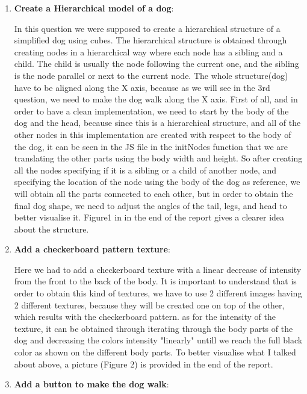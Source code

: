 \documentclass{article}
\begin{document}
\begin{enumerate}
\item \textbf{Create a Hierarchical model of a dog}:

In this question we were supposed to create a hierarchical structure of a simplified dog using cubes. The hierarchical structure is obtained through creating nodes in a hierarchical way where each node has a sibling and a child. The child is usually the node following the current one, and the sibling is the node parallel or next to the current node. The whole structure(dog) have to be aligned along the X axis, because as we will see in the 3rd question, we need to make the dog walk along the X axis. First of all, and in order to have a clean implementation, we need to start by the body of the dog and the head, because since this is a hierarchical structure, and all of the other nodes in this implementation are created with respect to the body of the dog, it can be seen in the JS file in the initNodes function that we are translating the other parts using the body width and height. So after creating all the nodes specifying if it is a sibling or a child of another node, and specifying the location of the node using the body of the dog as reference, we will obtain all the parts connected to each other, but in order to obtain the final dog shape, we need to adjust the angles of the tail, legs, and head to better visualise it. Figure1 in in the end of the report gives a clearer idea about the structure.

\item \textbf{Add a checkerboard pattern texture}:

Here we had to add a checkerboard texture with a linear decrease of intensity from the front to the back of the body. It is important to understand that is order to obtain this kind of textures, we have to use 2 different images having 2 different textures, because they will be created one on top of the other, which results with the checkerboard pattern. as for the intensity of the texture, it can be obtained through iterating through the body parts of the dog and decreasing the colors intensity "linearly" untill we reach the full black color as shown on the different body parts. To better visualise what I talked about above, a picture (Figure 2) is provided in the end of the report.


\item \textbf{Add a button to make the dog walk}:


\end{enumerate}
\end{document}
